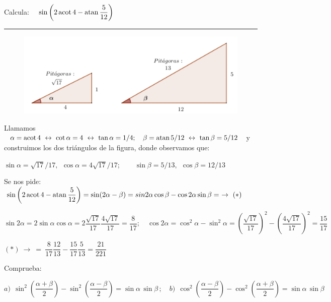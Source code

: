 \begin{miejercicio}

Calcula: $\quad \sin \left( 2 \acot 4 - \atan \dfrac 5{12} \right)$

\rule{250pt}{0.1pt}
\begin{figure}[H]
	\centering
	\includegraphics[width=.8\textwidth]{img-ft/ft07.png}
	\end{figure}	
Llamamos  $\ \alpha= \acot 4 \ \leftrightarrow \ \cot \alpha = 4 \ \leftrightarrow \ \tan \alpha =1/4 ;\quad  \beta = \atan 5/12 \ \leftrightarrow \ \tan \beta =5/12\ $ y construimos los dos triángulos de la figura, donde observamos que:


\vspace{2mm} $\sin \alpha= \sqrt{17}/17,\ \ \cos \alpha= 4\sqrt{17}/17;\qquad \sin \beta= 5/13,\ \ \cos \beta= 12/13$
	
\vspace{2mm} Se nos pide: $\ \sin \left( 2 \acot 4 - \atan \dfrac 5{12} \right)=\sin(2\alpha -\beta)=sin 2\alpha \cos \beta - \cos 2\alpha \sin \beta = \ \to \ (*)$

\vspace{2mm} \begin{footnotesize}
  $ \sin 2 \alpha=2\sin \alpha \cos \alpha =2  \dfrac{\sqrt{17}}{17}  \dfrac{4\sqrt{17}}{17}=\dfrac{8}{17};\quad \cos 2\alpha=\cos^2 \alpha-\sin^2 \alpha= \left(  \dfrac{\sqrt{17}}{17} \right)^2-\left(  \dfrac{4\sqrt{17}}{17} \right)^2=\dfrac{15}{17} $	
 \end{footnotesize}

\vspace{2mm}$(*)\ \to\  = \ \dfrac{8}{17}\dfrac{12}{13}-\dfrac{15}{17}\dfrac{5}{13}=\dfrac{21}{221}$ 
\end{miejercicio}




\vspace{10mm} %
\begin{mipropuesto}

 Comprueba: 
 
 \vspace{2mm} $a)\ \ \sin^2 \left( \dfrac{\alpha+\beta}{2} \right)-\sin^2 \left( \dfrac{\alpha-\beta}{2} \right)=\sin \alpha \, \sin \beta \, ; \quad b)\ \  \cos^2 \left( \dfrac{\alpha-\beta}{2} \right)-\cos^2 \left( \dfrac{\alpha+\beta}{2} \right)=\sin \alpha \, \sin \beta$

\end{mipropuesto}

